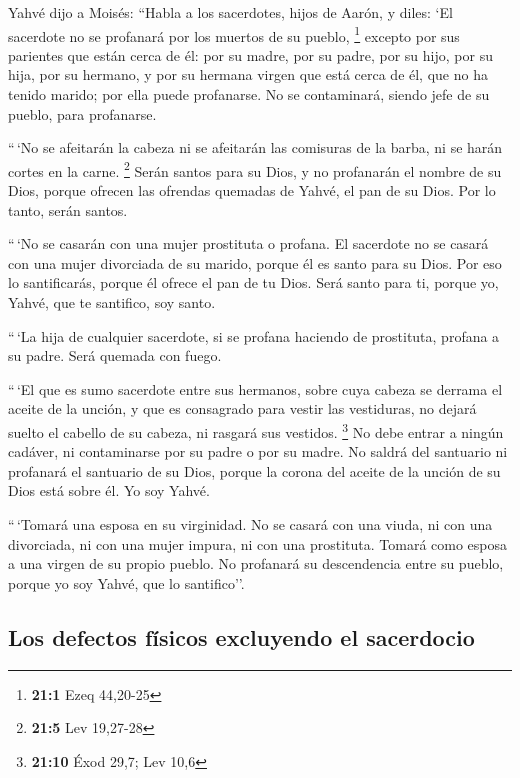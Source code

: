  Yahvé dijo a Moisés: ``Habla a los sacerdotes, hijos de
Aarón, y diles: `El sacerdote no se profanará por los muertos de su
pueblo, \footnote{\textbf{21:1} Ezeq 44,20-25}  excepto
por sus parientes que están cerca de él: por su madre, por su padre, por
su hijo, por su hija, por su hermano,  y por su hermana
virgen que está cerca de él, que no ha tenido marido; por ella puede
profanarse.  No se contaminará, siendo jefe de su pueblo,
para profanarse.

 ``\,`No se afeitarán la cabeza ni se afeitarán las
comisuras de la barba, ni se harán cortes en la carne. \footnote{\textbf{21:5}
  Lev 19,27-28}  Serán santos para su Dios, y no
profanarán el nombre de su Dios, porque ofrecen las ofrendas quemadas de
Yahvé, el pan de su Dios. Por lo tanto, serán santos.

 ``\,`No se casarán con una mujer prostituta o profana. El
sacerdote no se casará con una mujer divorciada de su marido, porque él
es santo para su Dios.  Por eso lo santificarás, porque él
ofrece el pan de tu Dios. Será santo para ti, porque yo, Yahvé, que te
santifico, soy santo.

 ``\,`La hija de cualquier sacerdote, si se profana
haciendo de prostituta, profana a su padre. Será quemada con fuego.

 ``\,`El que es sumo sacerdote entre sus hermanos, sobre
cuya cabeza se derrama el aceite de la unción, y que es consagrado para
vestir las vestiduras, no dejará suelto el cabello de su cabeza, ni
rasgará sus vestidos. \footnote{\textbf{21:10} Éxod 29,7; Lev 10,6}
 No debe entrar a ningún cadáver, ni contaminarse por su
padre o por su madre.  No saldrá del santuario ni
profanará el santuario de su Dios, porque la corona del aceite de la
unción de su Dios está sobre él. Yo soy Yahvé.

 ``\,`Tomará una esposa en su virginidad. 
No se casará con una viuda, ni con una divorciada, ni con una mujer
impura, ni con una prostituta. Tomará como esposa a una virgen de su
propio pueblo.  No profanará su descendencia entre su
pueblo, porque yo soy Yahvé, que lo santifico''.

\hypertarget{los-defectos-fuxedsicos-excluyendo-el-sacerdocio}{%
\subsection{Los defectos físicos excluyendo el
sacerdocio}\label{los-defectos-fuxedsicos-excluyendo-el-sacerdocio}}

